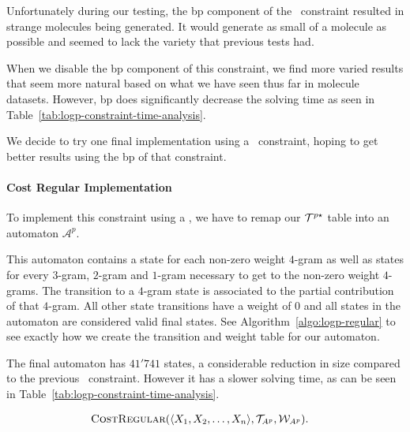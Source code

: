 \documentclass[../Document.tex]{subfiles}
\begin{document}
Unfortunately during our testing, the \acrlong{bp} component of the \shortTable\ constraint resulted in strange molecules being generated. It would generate as small of a molecule as possible and seemed to lack the variety that previous tests had. 

When we disable the \gls{bp} component of this constraint, we find more varied results that seem more natural based on what we have seen thus far in molecule datasets. However, \gls{bp} does significantly decrease the solving time as seen in Table~\ref{tab:logp-constraint-time-analysis}.

We decide to try one final implementation using a \costregular\ constraint, hoping to get better results using the \gls{bp} of that constraint.






\paragraph{Cost Regular Implementation}
To implement this constraint using a \costregular, we have to remap our ${\cal T}^{p\star}$ table into an automaton $\mathcal{A}^p$.

This automaton contains a state for each non-zero weight $4$-gram as well as states for every $3$-gram, $2$-gram and $1$-gram necessary to get to the non-zero weight $4$-grams.
The transition to a $4$-gram state is associated to the partial contribution of that $4$-gram.
All other state transitions have a weight of 0 and all states in the automaton are considered valid final states.
See Algorithm~\ref{algo:logp-regular} to see exactly how we create the transition and weight table for our automaton.

The final automaton has $41'741$ states, a considerable reduction in size compared to the previous \shortTable\ constraint. However it has a slower solving time, as can be seen in Table~\ref{tab:logp-constraint-time-analysis}.

\begin{align*}
    &\mbox{\sc CostRegular}(\langle X_1, X_2, \ldots, X_n \rangle, {\cal T}_{A^p}, {\cal W}_{A^p}).
\end{align*}
\end{document}

